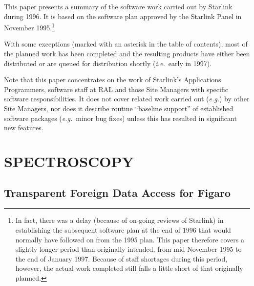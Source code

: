 This paper presents a summary of the software work carried out by
Starlink during 1996.  It is based on the software plan approved by
the Starlink Panel in November 1995.\footnote {In fact, there was a
delay (because of on-going reviews of Starlink) in establishing the
subsequent software plan at the end of 1996 that would normally have
followed on from the 1995 plan. This paper therefore covers a slightly
longer period than originally intended, from mid-November 1995 to the
end of January 1997. Because of staff shortages during this period,
however, the actual work completed still falls a little short of that
originally planned.}

With some exceptions (marked with an asterisk in the table of
contents), most of the planned work has been completed and the
resulting products have either been distributed or are queued for
distribution shortly ({\em{i.e.}}\ early in 1997).

Note that this paper concentrates on the work of Starlink's
Applications Programmers, software staff at RAL and those Site
Managers with specific software responsibilities. It does not cover
related work carried out ({\em{e.g.}}) by other Site Managers, nor
does it describe routine ``baseline support'' of established software
packages ({\em{e.g.}}\ minor bug fixes) unless this has resulted in
significant new features.

 \begin{latexonly}
   \setlength{\parskip}{0mm}
   \latexonlytoc
   \setlength{\parskip}{\medskipamount}
   \markright{\stardocname}
 \end{latexonly}
\newpage
\renewcommand{\thepage}{\arabic{page}}
\setcounter{page}{1}

\section{SPECTROSCOPY}

\subsection{\label{spec:figaro}Transparent Foreign Data Access for Figaro}

